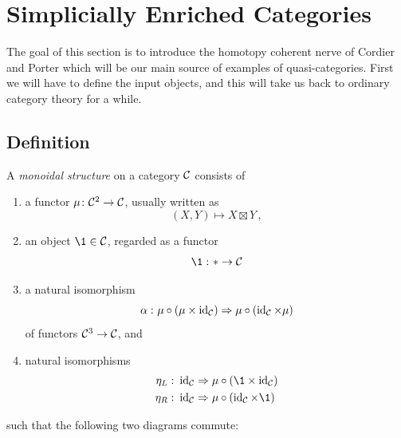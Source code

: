 \chapter{Simplicially Enriched Categories}
    The goal of this section is to introduce the homotopy coherent nerve of Cordier and Porter which will be our main source of examples of quasi-categories. First we will have to define the input objects, and this will take us back to ordinary category theory for a while.

    \section{Definition}\label{chIV-1}
        A \emph{monoidal structure} on a category $\mathcal{C}$ consists of
        \begin{enumerate}[label=\roman*)]
            \item
                a functor $\mu \colon \mathcal{C}^2 \to \mathcal{C}$, usually written as
                \begin{equation*}
                    (X, Y) \mapsto X \boxtimes Y \,,
                \end{equation*}
            \item
                an object $\1 \in \Cc$, regarded as a functor
                \begin{equation*}
                    \1 \,\colon * \to \Cc
                \end{equation*}
            \item
                a natural isomorphism
                \begin{equation*}
                    \alpha \,\colon \mu \circ \left( \mu \times \operatorname{id}_{\mathcal{C}} \right) \Rightarrow \mu \circ \left( \operatorname{id}_{\mathcal{C}} \times \mu \right)
                \end{equation*}
                of functors $\mathcal{C}^3 \to \mathcal{C}$, and
            \item
                natural isomorphisms
                \begin{align*}
                    \eta_L \,\colon \id_{\Cc} &\Rightarrow \mu \circ \left( \1 \times \id_{\Cc} \right) \\
                    \eta_R \,\colon \id_{\Cc} &\Rightarrow \mu \circ \left( \id_{\Cc} \times \1 \right)
                \end{align*}
        \end{enumerate}
        such that the following two diagrams commute:
